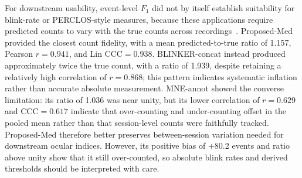 
For downstream usability, event-level $F_1$ did not by itself establish suitability for blink-rate or PERCLOS-style measures, because these applications require predicted counts to vary with the true counts across recordings~\citep{dai2023detection,zulkarnanie2022enhancements,ren2019comparison,alyan2023blink}. Proposed-Med provided the closest count fidelity, with a mean predicted-to-true ratio of 1.157, Pearson $r=0.941$, and Lin CCC$=0.938$. BLINKER-concat instead produced approximately twice the true count, with a ratio of 1.939, despite retaining a relatively high correlation of $r=0.868$; this pattern indicates systematic inflation rather than accurate absolute measurement. MNE-annot showed the converse limitation: its ratio of 1.036 was near unity, but its lower correlation of $r=0.629$ and CCC$=0.617$ indicate that over-counting and under-counting offset in the pooled mean rather than that session-level counts were faithfully tracked. Proposed-Med therefore better preserves between-session variation needed for downstream ocular indices. However, its positive bias of +80.2 events and ratio above unity show that it still over-counted, so absolute blink rates and derived thresholds should be interpreted with care.
